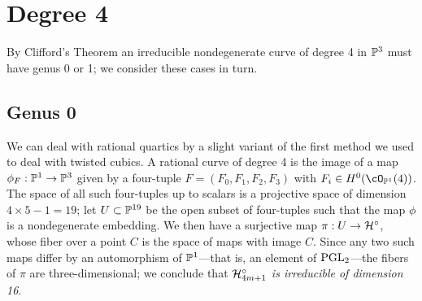 %
%
%
%
%
%

\section{Degree 4}

By Clifford's Theorem  an irreducible nondegenerate curve of degree 4 in $\PP^{3}$ must have genus 0 or 1; we consider these cases in turn.

\subsection{Genus 0}\label{degree 4 genus 0}

We can deal with rational quartics by a slight variant of the first method we used to deal with twisted cubics. A rational curve of degree 4 is the image of a map $\phi_F : \PP^1 \to \PP^3$ given by a four-tuple $F = (F_0,F_1,F_2,F_3)$ with $F_i \in H^0(\cO_{\PP^1}(4))$. The space of all such four-tuples up to scalars is a projective space of dimension $4 \times 5 - 1 = 19$; let $U \subset \PP^{19}$ be the open subset of four-tuples such that the map $\phi$ is a nondegenerate embedding. We then have a surjective map $\pi : U \to \cH^\circ$, whose fiber over a point $C$ is the space of maps with image $C$. Since any two such maps differ by an automorphism of $\PP^1$---that is, an element of $\PGL_2$---the fibers of $\pi$ are three-dimensional; we conclude that \emph{$\cH^\circ_{4m+1}$ is irreducible of dimension 16}.

